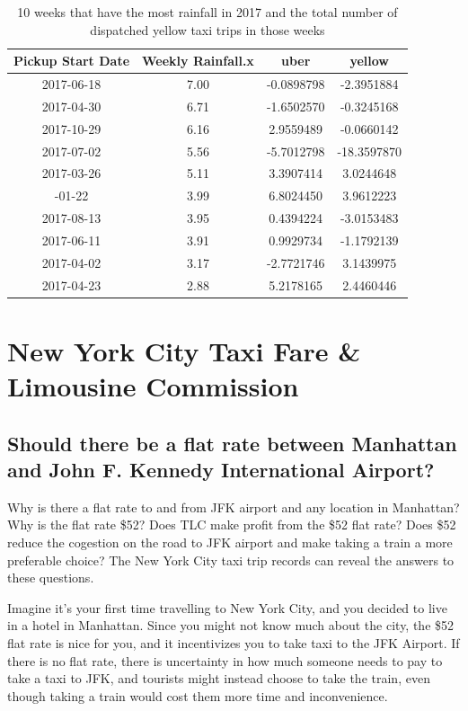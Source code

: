 \documentclass[12pt,twoside]{reedthesis}
\theoremstyle{definition}
\theoremstyle{definition}
\theoremstyle{definition}
\theoremstyle{remark}
\begin{document}
\begin{table}

\caption{\label{tab:unnamed-chunk-77}10 weeks that have the most rainfall in 2017 and the total number of dispatched yellow taxi trips in those weeks}
\centering
\begin{tabular}[t]{cccc}
\toprule
Pickup Start Date & Weekly Rainfall.x & uber & yellow\\
\midrule
2017-06-18 & 7.00 & -0.0898798 & -2.3951884\\
2017-04-30 & 6.71 & -1.6502570 & -0.3245168\\
2017-10-29 & 6.16 & 2.9559489 & -0.0660142\\
2017-07-02 & 5.56 & -5.7012798 & -18.3597870\\
2017-03-26 & 5.11 & 3.3907414 & 3.0244648\\
\addlinespace
2017-01-22 & 3.99 & 6.8024450 & 3.9612223\\
2017-08-13 & 3.95 & 0.4394224 & -3.0153483\\
2017-06-11 & 3.91 & 0.9929734 & -1.1792139\\
2017-04-02 & 3.17 & -2.7721746 & 3.1439975\\
2017-04-23 & 2.88 & 5.2178165 & 2.4460446\\
\bottomrule
\end{tabular}
\end{table}
\chapter{New York City Taxi Fare \& Limousine
Commission}\label{chapter5}

\section{Should there be a flat rate between Manhattan and John F.
Kennedy International
Airport?}\label{should-there-be-a-flat-rate-between-manhattan-and-john-f.-kennedy-international-airport}

Why is there a flat rate to and from JFK airport and any location in
Manhattan? Why is the flat rate \$52? Does TLC make profit from the \$52
flat rate? Does \$52 reduce the cogestion on the road to JFK airport and
make taking a train a more preferable choice? The New York City taxi
trip records can reveal the answers to these questions.

Imagine it's your first time travelling to New York City, and you
decided to live in a hotel in Manhattan. Since you might not know much
about the city, the \$52 flat rate is nice for you, and it incentivizes
you to take taxi to the JFK Airport. If there is no flat rate, there is
uncertainty in how much someone needs to pay to take a taxi to JFK, and
tourists might instead choose to take the train, even though taking a
train would cost them more time and inconvenience.
\end{document}

